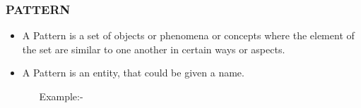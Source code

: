 \documentclass{beamer}
\begin{document}
\begin{frame}
\transpush
\frametitle{PATTERN}
\begin{itemize}
\item A Pattern is a set of objects or phenomena or concepts where the element of the set are similar to one another in certain ways or aspects. \pause
\item A Pattern is an entity, that could be given a name. \pause
\begin{itemize}
\vspace{1cm}\item[Example:-]
\end{itemize}
\end{itemize}


\begin{columns}

\begin{column}{.3\textwidth}






\end{column}
\end{columns}
\end{frame}
\end{document}
